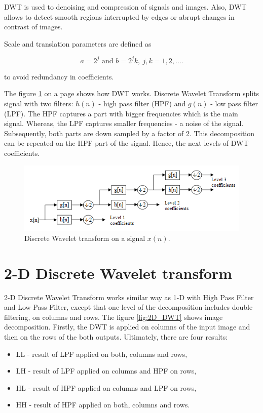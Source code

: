 DWT is used to denoising and compression of signals and images. Also, DWT allows to detect smooth regions interrupted by edges or abrupt changes in contrast of images.

Scale and translation parameters are defined as

\begin{equation}
a = 2^j \text{ and } b = 2^j k,\ j,k=1,2,\ldots.
\end{equation}

to avoid redundancy in coefficients.


The figure \ref{fig:DWT} on a page \pageref{fig:DWT} shows how DWT works. Discrete Wavelet Transform splits signal with two filters: $h(n)$ - high pass filter (HPF) and $g(n)$ - low pass filter (LPF). The HPF captures a part with bigger frequencies which is the main signal. Whereas, the LPF captures smaller frequencies - a noise of the signal. Subsequently, both parts are down sampled by a factor of 2. This decomposition can be repeated on the HPF part of the signal. Hence, the next levels of DWT coefficients.

\begin{figure}[h]
	\centering
	\includegraphics[width=\textwidth]{DWT.png}
	\caption{Discrete Wavelet transform on a signal $x(n)$.}
	\label{fig:DWT}
\end{figure}


\section{2-D Discrete Wavelet transform}

2-D Discrete Wavelet Transform works similar way as 1-D with High Pass Filter and Low Pass Filter, except that one level of the decomposition includes double filtering, on columns and rows. The figure \ref{fig:2D_DWT} shows image decomposition. Firstly, the DWT is applied on columns of the input image and then on the rows of the both outputs. Ultimately, there are four results:

\begin{itemize}
\item LL - result of LPF applied on both, columns and rows,
\item LH - result of LPF applied on columns and HPF on rows,
\item HL - result of HPF applied on columns and LPF on rows,
\item HH - result of HPF applied on both, columns and rows.
\end{itemize}  

